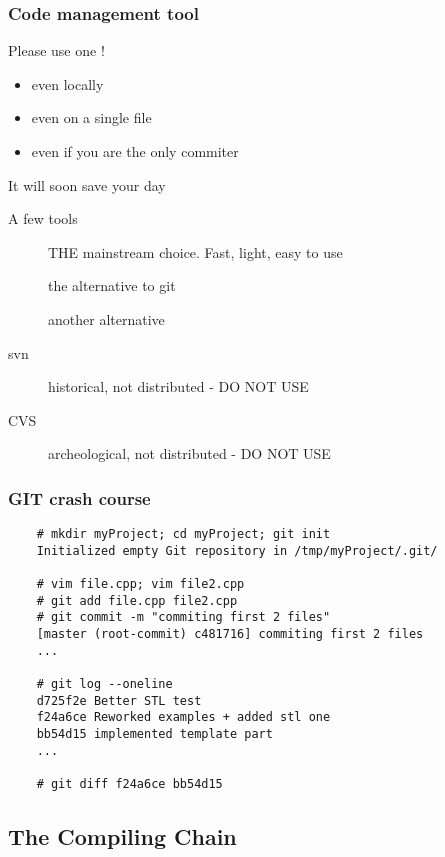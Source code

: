 \begin{frame}[fragile]
  \frametitle{Code management tool}
  \begin{alertblock}{Please use one !}
    \begin{itemize}
    \item even locally
    \item even on a single file
    \item even if you are the only commiter
    \end{itemize}
    It will soon save your day
  \end{alertblock}
  \begin{block}{A few tools}
    \begin{description}
    \item[\href{http://git-scm.com/}{}]
      THE mainstream choice. Fast, light, easy to use
    \item[\href{http://mercurial.selenic.com/}{}]
      the alternative to git
    \item[\href{http://bazaar.canonical.com/en/}{}]
      another alternative
    \item[svn]
      historical, not distributed - DO NOT USE
    \item[CVS]
      archeological, not distributed - DO NOT USE
    \end{description}
  \end{block}
\end{frame}

\begin{frame}[fragile]
  \frametitle{GIT crash course}
  \begin{verbatim}
    # mkdir myProject; cd myProject; git init
    Initialized empty Git repository in /tmp/myProject/.git/

    # vim file.cpp; vim file2.cpp
    # git add file.cpp file2.cpp
    # git commit -m "commiting first 2 files"
    [master (root-commit) c481716] commiting first 2 files
    ...

    # git log --oneline
    d725f2e Better STL test
    f24a6ce Reworked examples + added stl one
    bb54d15 implemented template part
    ...

    # git diff f24a6ce bb54d15
  \end{verbatim}
\end{frame}

\subsection[gcc]{The Compiling Chain}

